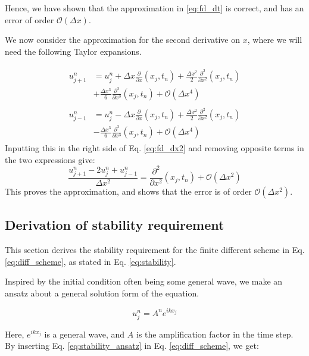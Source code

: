 Hence, we have shown that the approximation in \eqref{eq:fd_dt} is correct, and has an error of order $\mathcal{O}(\Delta x)$.

We now consider the approximation for the second derivative on $x$, where we will need the following Taylor expansions.

\begin{align}
\begin{split}
    u_{j+1}^n &= u_j^n + \Delta x \frac{\partial}{\partial x}(x_j, t_n) 
    + \frac{\Delta x^2}{2} \frac{\partial^2}{\partial x^2}(x_j, t_n) 
    \\ &+ \frac{\Delta x^3}{6} \frac{\partial^3}{\partial x^3}(x_j, t_n)
    + \mathcal{O}(\Delta x^4)
\end{split} \\
\begin{split}
    u_{j-1}^n &= u_j^n - \Delta x \frac{\partial}{\partial x}(x_j, t_n)
    + \frac{\Delta x^2}{2} \frac{\partial^2}{\partial x^2}(x_j, t_n) 
    \\ &- \frac{\Delta x^3}{6} \frac{\partial^3}{\partial x^3}(x_j, t_n)
    + \mathcal{O}(\Delta x^4)
\end{split}
\end{align}
Inputting this in the right side of Eq. \eqref{eq:fd_dx2} and removing opposite terms in the two expressions give:
\begin{equation}
    \frac{u_{j+1}^n - 2u_j^n + u_{j-1}^n}{\Delta x^2} =
    \frac{\partial^2}{\partial x^2}(x_j, t_n) + \mathcal{O}(\Delta x^2)
\end{equation}
This proves the approximation, and shows that the error is of order $\mathcal{O}(\Delta x^2)$.
\newpage
\subsection{Derivation of stability requirement} \label{appendixD}

This section derives the stability requirement for the finite different scheme in Eq. \ref{eq:diff_scheme}, as stated in Eq. \ref{eq:stability}.

Inspired by the initial condition often being some general wave, we make an ansatz about a general solution form of the equation.

\begin{equation}
    \label{eq:stability_ansatz}
    u_j^n = A^n e^{i k x_j}
\end{equation}

Here, $e^{i k x_j}$ is a general wave, and $A$ is the amplification factor in the time step.
By inserting Eq. \ref{eq:stability_ansatz} in Eq. \ref{eq:diff_scheme}, we get:

